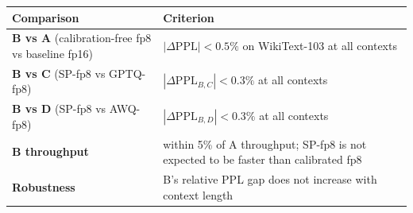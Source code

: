 \documentclass[
  11pt,
]{article}
\begin{document}
\begin{longtable}[]{@{}ll@{}}
\toprule
\begin{minipage}[b]{0.47\columnwidth}\raggedright
Comparison\strut
\end{minipage} & \begin{minipage}[b]{0.47\columnwidth}\raggedright
Criterion\strut
\end{minipage}\tabularnewline
\midrule
\endhead
\begin{minipage}[t]{0.47\columnwidth}\raggedright
\textbf{B vs A} (calibration-free fp8 vs baseline fp16)\strut
\end{minipage} & \begin{minipage}[t]{0.47\columnwidth}\raggedright
\(|\Delta\mathrm{PPL}| < 0.5\%\) on WikiText-103 at all contexts\strut
\end{minipage}\tabularnewline
\begin{minipage}[t]{0.47\columnwidth}\raggedright
\textbf{B vs C} (SP-fp8 vs GPTQ-fp8)\strut
\end{minipage} & \begin{minipage}[t]{0.47\columnwidth}\raggedright
\(|\Delta\mathrm{PPL}_{B,C}| < 0.3\%\) at all contexts\strut
\end{minipage}\tabularnewline
\begin{minipage}[t]{0.47\columnwidth}\raggedright
\textbf{B vs D} (SP-fp8 vs AWQ-fp8)\strut
\end{minipage} & \begin{minipage}[t]{0.47\columnwidth}\raggedright
\(|\Delta\mathrm{PPL}_{B,D}| < 0.3\%\) at all contexts\strut
\end{minipage}\tabularnewline
\begin{minipage}[t]{0.47\columnwidth}\raggedright
\textbf{B throughput}\strut
\end{minipage} & \begin{minipage}[t]{0.47\columnwidth}\raggedright
within 5\% of A throughput; SP-fp8 is not expected to be faster than
calibrated fp8\strut
\end{minipage}\tabularnewline
\begin{minipage}[t]{0.47\columnwidth}\raggedright
\textbf{Robustness}\strut
\end{minipage} & \begin{minipage}[t]{0.47\columnwidth}\raggedright
B's relative PPL gap does not increase with context length\strut
\end{minipage}\tabularnewline
\bottomrule
\end{longtable}
\end{document}
